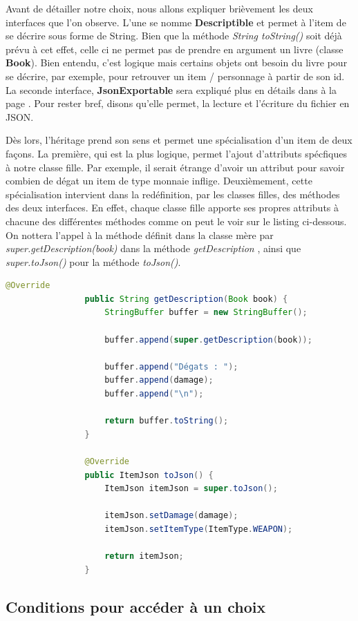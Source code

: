 			Avant de détailler notre choix, nous allons expliquer brièvement les deux interfaces que l'on observe. L'une se nomme \textbf{Descriptible} et permet à l'item de se décrire sous forme de String. Bien que la méthode \textit{String toString()} soit déjà prévu à cet effet, celle ci ne permet pas de prendre en argument un livre (classe \textbf{Book}). Bien entendu, c'est logique mais certains objets ont besoin du livre pour se décrire, par exemple, pour retrouver un item / personnage à partir de son id. La seconde interface, \textbf{JsonExportable} sera expliqué plus en détails dans  à la page \pageref{subsec:lecture_ecriture_fichier}. Pour rester bref, disons qu'elle permet, la lecture et l'écriture du fichier en JSON.

			Dès lors, l'héritage prend son sens et permet une spécialisation d'un item de deux façons. La première, qui est la plus logique, permet l'ajout d'attributs spécfiques à notre classe fille. Par exemple, il serait étrange d'avoir un attribut pour savoir combien de dégat un item de type monnaie inflige. Deuxièmement, cette spécialisation intervient dans la redéfinition, par les classes filles, des méthodes des deux interfaces. En effet, chaque classe fille apporte ses propres attributs à chacune des différentes méthodes comme on peut le voir sur le listing ci-dessous. On nottera l'appel à la méthode définit dans la classe mère par \textit{super.getDescription(book)} dans la méthode \textit{getDescription} , ainsi que \textit{super.toJson()} pour la méthode \textit{toJson()}.

			\begin{lstlisting}[gobble=16, language=Java, caption=Exemple de spécialisation des items]
				@Override
				public String getDescription(Book book) {
					StringBuffer buffer = new StringBuffer();

					buffer.append(super.getDescription(book));

					buffer.append("Dégats : ");
					buffer.append(damage);
					buffer.append("\n");

					return buffer.toString();
				}

				@Override
				public ItemJson toJson() {
					ItemJson itemJson = super.toJson();

					itemJson.setDamage(damage);
					itemJson.setItemType(ItemType.WEAPON);

					return itemJson;
				}
			\end{lstlisting}

		\subsection{Conditions pour accéder à un choix}

